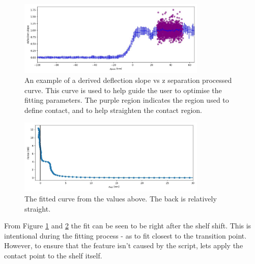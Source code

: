 \begin{figure}[h!]
\centering
\includegraphics[width=0.8\textwidth]{chapter8/Shelf/Post 1.6 S4 df_deriv_bin.jpg}
\caption{An example of a derived deflection slope vs z separation processed curve. This curve is used to help guide the user to optimise the fitting parameters. The purple region indicates the region used to define contact, and to help straighten the contact region.}
\label{fig:Deriv1}
\end{figure}
\begin{figure}[h!]
\centering
\includegraphics[width=0.8\textwidth]{chapter8/Shelf/Post approach_force_sep.jpg}
\caption{The fitted curve from the values above. The back is relatively straight.}
\label{fig:CurveBack}
\end{figure}

From Figure \ref{fig:Deriv1} and \ref{fig:CurveBack} the fit can be seen to be right after the shelf shift. This is intentional during the fitting process - as to fit closest to the transition point. However, to ensure that the feature isn't caused by the script, lets apply the contact point to the shelf itself.

